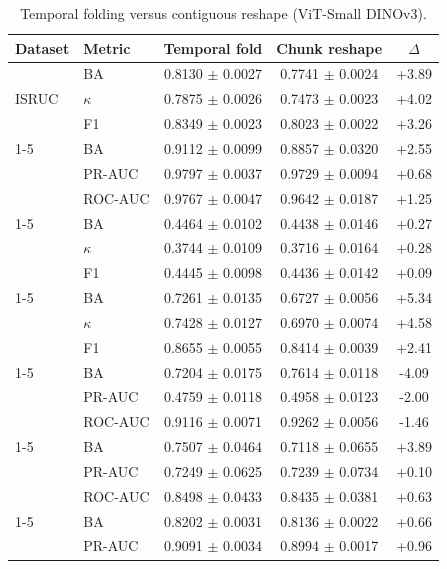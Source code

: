 \begin{table}[tbp]\centering\scriptsize\caption{Temporal folding versus contiguous reshape (ViT-Small DINOv3).}\begin{tabular}{@{}l l c c c@{}}\toprule Dataset & Metric & Temporal fold & Chunk reshape & $\Delta$ \\ \midrule
\multirow{3}{*}{ISRUC} & BA & 0.8130 $\pm$ 0.0027 & 0.7741 $\pm$ 0.0024 & +3.89 \\
 & $\kappa$ & 0.7875 $\pm$ 0.0026 & 0.7473 $\pm$ 0.0023 & +4.02 \\
 & F1 & 0.8349 $\pm$ 0.0023 & 0.8023 $\pm$ 0.0022 & +3.26 \\
\cmidrule(lr){1-5}
\multirow{3}{*}{Mumtaz2016} & BA & 0.9112 $\pm$ 0.0099 & 0.8857 $\pm$ 0.0320 & +2.55 \\
 & PR-AUC & 0.9797 $\pm$ 0.0037 & 0.9729 $\pm$ 0.0094 & +0.68 \\
 & ROC-AUC & 0.9767 $\pm$ 0.0047 & 0.9642 $\pm$ 0.0187 & +1.25 \\
\cmidrule(lr){1-5}
\multirow{3}{*}{FACED} & BA & 0.4464 $\pm$ 0.0102 & 0.4438 $\pm$ 0.0146 & +0.27 \\
 & $\kappa$ & 0.3744 $\pm$ 0.0109 & 0.3716 $\pm$ 0.0164 & +0.28 \\
 & F1 & 0.4445 $\pm$ 0.0098 & 0.4436 $\pm$ 0.0142 & +0.09 \\
\cmidrule(lr){1-5}
\multirow{3}{*}{TUEV} & BA & 0.7261 $\pm$ 0.0135 & 0.6727 $\pm$ 0.0056 & +5.34 \\
 & $\kappa$ & 0.7428 $\pm$ 0.0127 & 0.6970 $\pm$ 0.0074 & +4.58 \\
 & F1 & 0.8655 $\pm$ 0.0055 & 0.8414 $\pm$ 0.0039 & +2.41 \\
\cmidrule(lr){1-5}
\multirow{3}{*}{CHB-MIT} & BA & 0.7204 $\pm$ 0.0175 & 0.7614 $\pm$ 0.0118 & -4.09 \\
 & PR-AUC & 0.4759 $\pm$ 0.0118 & 0.4958 $\pm$ 0.0123 & -2.00 \\
 & ROC-AUC & 0.9116 $\pm$ 0.0071 & 0.9262 $\pm$ 0.0056 & -1.46 \\
\cmidrule(lr){1-5}
\multirow{3}{*}{MentalArithmetic} & BA & 0.7507 $\pm$ 0.0464 & 0.7118 $\pm$ 0.0655 & +3.89 \\
 & PR-AUC & 0.7249 $\pm$ 0.0625 & 0.7239 $\pm$ 0.0734 & +0.10 \\
 & ROC-AUC & 0.8498 $\pm$ 0.0433 & 0.8435 $\pm$ 0.0381 & +0.63 \\
\cmidrule(lr){1-5}
\multirow{3}{*}{TUAB} & BA & 0.8202 $\pm$ 0.0031 & 0.8136 $\pm$ 0.0022 & +0.66 \\
 & PR-AUC & 0.9091 $\pm$ 0.0034 & 0.8994 $\pm$ 0.0017 & +0.96 \\

\end{tabular}
\end{table}
